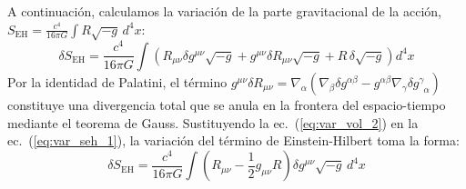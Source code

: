 A continuación, calculamos la variación de la parte gravitacional de la acción, $S_{\mathrm{EH}} = \frac{c^4}{16\pi G} \int R \sqrt{-g} \, d^4x$:
\begin{equation}
    \delta S_{\mathrm{EH}} = \frac{c^4}{16\pi G} \int \left( R_{\mu\nu} \delta g^{\mu\nu} \sqrt{-g} + g^{\mu\nu} \delta R_{\mu\nu} \sqrt{-g} + R \, \delta \sqrt{-g} \right) d^4x
    \label{eq:var_seh_1}
\end{equation}
Por la identidad de Palatini, el término $g^{\mu\nu} \delta R_{\mu\nu} = \nabla_\alpha (\nabla_\beta \delta g^{\alpha\beta} - g^{\alpha\beta} \nabla_\gamma \delta g^{\gamma}_{\phantom{\gamma}\alpha})$ constituye una divergencia total que se anula en la frontera del espacio-tiempo mediante el teorema de Gauss. Sustituyendo la ec.~(\ref{eq:var_vol_2}) en la ec.~(\ref{eq:var_seh_1}), la variación del término de Einstein-Hilbert toma la forma:
\begin{equation}
    \delta S_{\mathrm{EH}} = \frac{c^4}{16\pi G} \int \left( R_{\mu\nu} - \frac{1}{2} g_{\mu\nu} R \right) \delta g^{\mu\nu} \sqrt{-g} \, d^4x
    \label{eq:var_seh_2}
\end{equation}

